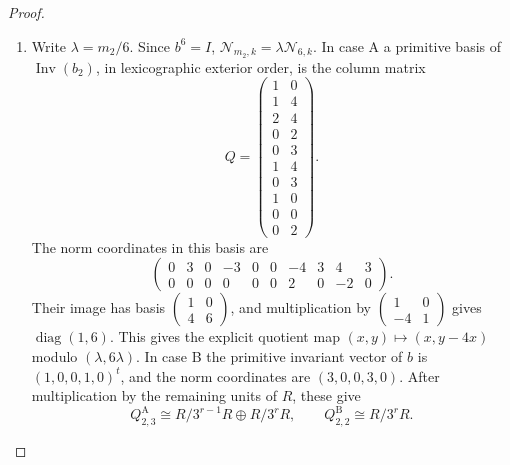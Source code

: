 \begin{proof}
\begin{enumerate}[label={$\langle1\rangle$\arabic*.}]
The covering map on the horizontal term of the Wang
sequence is the norm
\[
 \mathcal N_{m_2,k}=\sum_{j=0}^{m_2-1}b_k^j:
 \operatorname{coker}(b_k-I)\longrightarrow\operatorname{Inv}(b_k).
\]
Indeed, the lift is the union of the $m_2$ successive prisms
with their transported coefficients.  On the vertical invariant
quotient pullback is the identity.  Consequently horizontal
inclusion induces the isomorphism
\[
 \frac{\operatorname{Inv}(b_{q-1})}
      {\mathcal N_{m_2,q-1}\bigwedge^{q-1}R^5}
 \ \xrightarrow{\ \sim\ }\
 \frac{\operatorname{Inv}(\bigwedge^q V_R)}{J_{2,q}}.
\]
Surjectivity follows by subtracting a restriction with the same
vertical component; its kernel is exactly the horizontal norm
image.  Thus no choice of a Wang splitting changes this quotient.

\item Write $\lambda=m_2/6$.  Since $b^6=I$,
$\mathcal N_{m_2,k}=\lambda\mathcal N_{6,k}$.
In case A a primitive basis of $\operatorname{Inv}(b_2)$,
in lexicographic exterior order, is the column matrix
\[
 Q=\begin{pmatrix}
 1&0\\1&4\\2&4\\0&2\\0&3\\1&4\\0&3\\1&0\\0&0\\0&2
 \end{pmatrix}.
\]
The norm coordinates in this basis are
\[
 \begin{pmatrix}
 0&3&0&-3&0&0&-4&3&4&3\\
 0&0&0&0&0&0&2&0&-2&0
 \end{pmatrix}.
\]
Their image has basis $\left(\begin{smallmatrix}1&0\\4&6\end{smallmatrix}\right)$,
and multiplication by
$\left(\begin{smallmatrix}1&0\\-4&1\end{smallmatrix}\right)$
gives $\operatorname{diag}(1,6)$.  This gives the explicit quotient
map $(x,y)\mapsto(x,y-4x)$ modulo $(\lambda,6\lambda)$.
In case B the primitive invariant vector of $b$ is
$(1,0,0,1,0)^t$, and the norm coordinates are $(3,0,0,3,0)$.
After multiplication by the remaining units of $R$, these give
\[
 Q_{2,3}^{\mathrm A}\cong R/3^{r-1}R\oplus R/3^rR,
 \qquad Q_{2,2}^{\mathrm B}\cong R/3^rR.
\]
\end{enumerate}
\end{proof}
